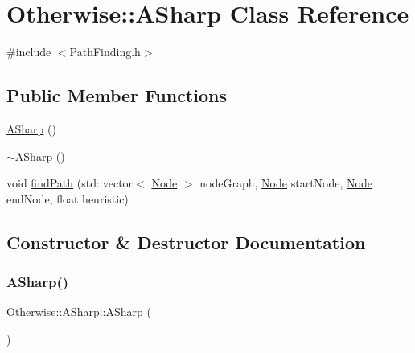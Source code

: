 \hypertarget{class_otherwise_1_1_a_sharp}{}\section{Otherwise\+:\+:A\+Sharp Class Reference}
\label{class_otherwise_1_1_a_sharp}


{\ttfamily \#include $<$Path\+Finding.\+h$>$}

\subsection*{Public Member Functions}
\begin{DoxyCompactItemize}
\item 
\hyperlink{class_otherwise_1_1_a_sharp_adccb01b10776ed7208c17c39f6cccb72}{A\+Sharp} ()
\item 
\hyperlink{class_otherwise_1_1_a_sharp_a46e8de53f57b27c7a01508bc24b133d8}{$\sim$\+A\+Sharp} ()
\item 
void \hyperlink{class_otherwise_1_1_a_sharp_aee3db2f71a9eb6f28f694cdde40fe437}{find\+Path} (std\+::vector$<$ \hyperlink{struct_otherwise_1_1_node}{Node} $>$ node\+Graph, \hyperlink{struct_otherwise_1_1_node}{Node} start\+Node, \hyperlink{struct_otherwise_1_1_node}{Node} end\+Node, float heuristic)
\end{DoxyCompactItemize}


\subsection{Constructor \& Destructor Documentation}
\mbox{\label{class_otherwise_1_1_a_sharp_adccb01b10776ed7208c17c39f6cccb72}} 
\subsubsection{\texorpdfstring{A\+Sharp()}{ASharp()}}
{\footnotesize\ttfamily Otherwise\+::\+A\+Sharp\+::\+A\+Sharp (\begin{DoxyParamCaption}{ }\end{DoxyParamCaption})}

\mbox{\label{class_otherwise_1_1_a_sharp_a46e8de53f57b27c7a01508bc24b133d8}} 
